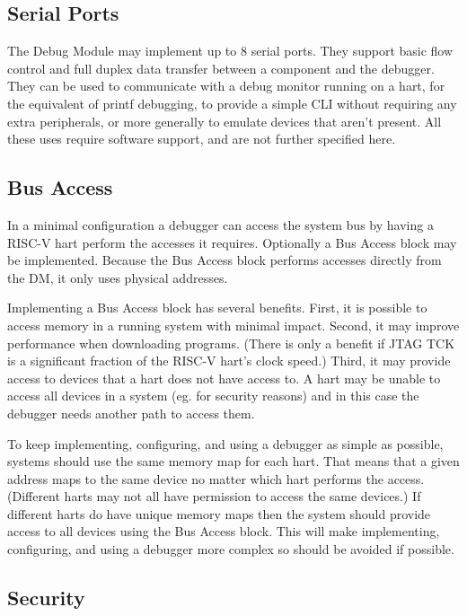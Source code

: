 \documentclass{article}
\begin{document}
\subsection{Serial Ports}

The Debug Module may implement up to 8 serial ports. They support basic flow
control and full duplex data transfer between a component and the debugger.
They can be used to communicate with a debug monitor running on a hart, for the
equivalent of printf debugging, to provide a simple CLI without requiring any
extra peripherals, or more generally to emulate devices that aren't present.
All these uses require software support, and are not further specified here.

\subsection{Bus Access}

In a minimal configuration a debugger can access the system bus by having a
RISC-V hart perform the accesses it requires. Optionally a Bus Access block may
be implemented. Because the Bus Access block performs accesses directly from
the DM, it only uses physical addresses.

Implementing a Bus Access block has several benefits. First, it is possible to
access memory in a running system with minimal impact.  Second, it may improve
performance when downloading programs. (There is only a benefit if JTAG TCK is a
significant fraction of the RISC-V hart's clock speed.)  Third, it may provide
access to devices that a hart does not have access to. A hart may be unable to
access all devices in a system (eg. for security reasons) and in this case the
debugger needs another path to access them.

To keep implementing, configuring, and using a debugger as simple as possible,
systems should use the same memory map for each hart. That means that a given
address maps to the same device no matter which hart performs the access.
(Different harts may not all have permission to access the same devices.) If
different harts do have unique memory maps then the system should provide
access to all devices using the Bus Access block. This will make implementing,
configuring, and using a debugger more complex so should be avoided if
possible.

\subsection{Security}
\end{document}
